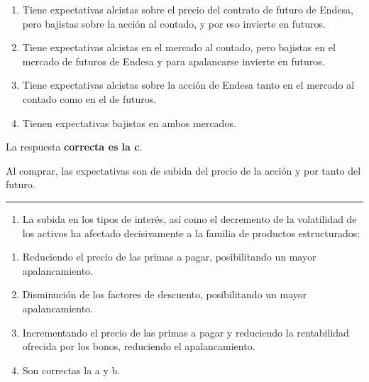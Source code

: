 \documentclass[
  letterpaper,
  DIV=11,
  numbers=noendperiod]{scrreprt}
\providecommand{\tightlist}{%
  \setlength{\itemsep}{0pt}\setlength{\parskip}{0pt}}\usepackage{longtable,booktabs,array}
\begin{document}
\begin{enumerate}
\def\labelenumi{\alph{enumi})}
\item
  Tiene expectativas alcistas sobre el precio del contrato de futuro de
  Endesa, pero bajistas sobre la acción al contado, y por eso invierte
  en futuros.
\item
  Tiene expectativas alcistas en el mercado al contado, pero bajistas en
  el mercado de futuros de Endesa y para apalancarse invierte en
  futuros.
\item
  Tiene expectativas alcistas sobre la acción de Endesa tanto en el
  mercado al contado como en el de futuros.
\item
  Tienen expectativas bajistas en ambos mercados.
\end{enumerate}

\begin{tcolorbox}[enhanced jigsaw, left=2mm, opacityback=0, colback=white, breakable, arc=.35mm, bottomrule=.15mm, rightrule=.15mm, toprule=.15mm, leftrule=.75mm, colframe=quarto-callout-tip-color-frame]
\begin{minipage}[t]{5.5mm}
\textcolor{quarto-callout-tip-color}{\faLightbulb}
\end{minipage}%
\begin{minipage}[t]{\textwidth - 5.5mm}

La respuesta \textbf{correcta es la c}.

Al comprar, las expectativas son de subida del precio de la acción y por
tanto del futuro.

\end{minipage}%
\end{tcolorbox}

\begin{center}\rule{0.5\linewidth}{0.5pt}\end{center}

\begin{enumerate}
\def\labelenumi{\arabic{enumi}.}
\setcounter{enumi}{30}
\tightlist
\item
  La subida en los tipos de interés, así como el decremento de la
  volatilidad de los activos ha afectado decisivamente a la familia de
  productos estructurados:
\end{enumerate}

\begin{enumerate}
\def\labelenumi{\alph{enumi})}
\item
  Reduciendo el precio de las primas a pagar, posibilitando un mayor
  apalancamiento.
\item
  Disminución de los factores de descuento, posibilitando un mayor
  apalancamiento.
\item
  Incrementando el precio de las primas a pagar y reduciendo la
  rentabilidad ofrecida por los bonos, reduciendo el apalancamiento.
\item
  Son correctas la a y b.
\end{enumerate}
\end{document}
